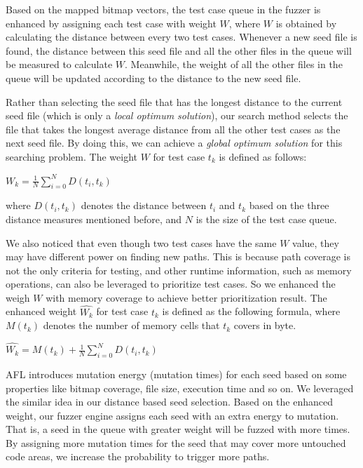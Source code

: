 Based on the mapped bitmap vectors, the test case queue in the fuzzer 
is enhanced by assigning each test case with weight $W$, where $W$ is 
obtained by calculating the distance between every two test cases. 
Whenever a new seed file is found, the distance between this seed file 
and all the other files in the queue will be measured to calculate $W$. 
Meanwhile, the weight of all the other files in the queue will be 
updated according to the distance to the new seed file. 

Rather than selecting the seed file that has the longest distance to 
the current seed file (which is only a \emph{local optimum solution}), 
our search method selects the file that takes the longest average 
distance from all the other test cases as the next seed file. By 
doing this, we can achieve a \emph{global optimum solution} for this 
searching problem. The weight $W$ for test case $t_k$ is defined 
as follows:

\begin{center}
$W_k = \displaystyle\frac{1}{N} \sum_{i=0}^{N} D(t_i, t_k)$
\end{center}
where $D(t_i, t_k)$ denotes the distance between $t_i$ and $t_k$ 
based on the three distance measures mentioned before, and $N$ is 
the size of the test case queue. 

We also noticed that even though two test cases have the same $W$ value, 
they may have different power on finding new paths.
This is because path coverage is not the only criteria for testing, 
and other runtime information, such as memory operations, 
can also be leveraged to prioritize test cases. 
So we enhanced the weigh $W$ with memory coverage to achieve 
better prioritization result. The enhanced weight $\hat{W_k}$ for 
test case $t_k$ is defined as the following formula, where $M(t_k)$ 
denotes the number of memory cells that $t_k$ covers in byte.
\begin{center}
$\hat{W_k} = \displaystyle M(t_k) + \frac{1}{N} \sum_{i=0}^{N} D(t_i, t_k)$
\end{center} 

AFL introduces mutation energy (mutation times) for each seed based 
on some properties like bitmap coverage, file size, execution time and so on. 
We leveraged the similar idea in our distance based seed selection. 
Based on the enhanced weight, our fuzzer engine assigns each seed with an extra
energy to mutation. That is, a seed in the queue with greater weight will
be fuzzed with more times. By assigning more mutation times for the seed that
may cover more untouched code areas, we increase the probability to trigger
more paths.